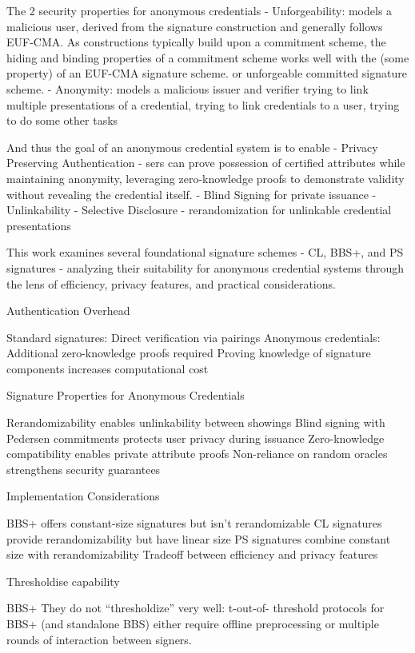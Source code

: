 {The 2 security properties for anonymous credentials 
- Unforgeability: models a malicious user, derived from the signature construction and generally follows EUF-CMA. As constructions typically build upon a commitment scheme, the hiding and binding properties of a commitment scheme works well with the (some property) of an EUF-CMA signature scheme. or unforgeable committed signature scheme. 
- Anonymity: models a malicious issuer and verifier trying to link multiple presentations of a credential, trying to link credentials to a user, trying to do some other tasks

And thus the goal of an anonymous credential system is to enable 
- Privacy Preserving Authentication - sers can prove possession of certified attributes while maintaining anonymity, leveraging zero-knowledge proofs to demonstrate validity without revealing the credential itself.
- Blind Signing for private issuance
- Unlinkability
- Selective Disclosure
- rerandomization for unlinkable credential presentations

This work examines several foundational signature schemes - CL, BBS+, and PS signatures - analyzing their suitability for anonymous credential systems through the lens of efficiency, privacy features, and practical considerations.





Authentication Overhead


Standard signatures: Direct verification via pairings
Anonymous credentials: Additional zero-knowledge proofs required
Proving knowledge of signature components increases computational cost


Signature Properties for Anonymous Credentials


Rerandomizability enables unlinkability between showings
Blind signing with Pedersen commitments protects user privacy during issuance
Zero-knowledge compatibility enables private attribute proofs
Non-reliance on random oracles strengthens security guarantees


Implementation Considerations


BBS+ offers constant-size signatures but isn't rerandomizable
CL signatures provide rerandomizability but have linear size
PS signatures combine constant size with rerandomizability
Tradeoff between efficiency and privacy features


Thresholdise capability

BBS+ They do not “thresholdize” very well: t-out-of- threshold protocols for BBS+ (and standalone BBS) either require offline preprocessing or multiple rounds of interaction between signers.



}
